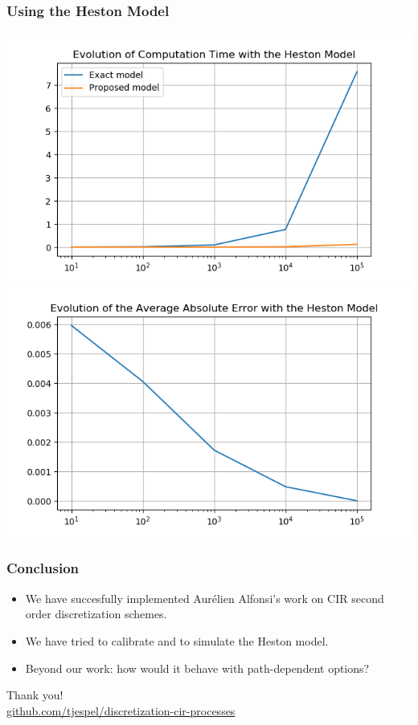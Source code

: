 \documentclass[12pt]{beamer}
\begin{document}
\begin{frame}
\frametitle{Using the Heston Model}
\centering
\includegraphics[width=.5\textwidth]{heston_time.png}
\includegraphics[width=.5\textwidth]{heston_error.png}
\end{frame}

\begin{frame}
\frametitle{Conclusion}
\begin{itemize}
  \item We have succesfully implemented Aurélien Alfonsi's work on CIR second order discretization schemes.
  \item We have tried to calibrate and to simulate the Heston model.
  \item Beyond our work: how would it behave with path-dependent options?
\end{itemize}
\end{frame}


\begin{frame}
\centering
{\Large Thank you!}
\\[1cm]
{\small\url{github.com/tjespel/discretization-cir-processes}}
\end{frame}
\end{document}
